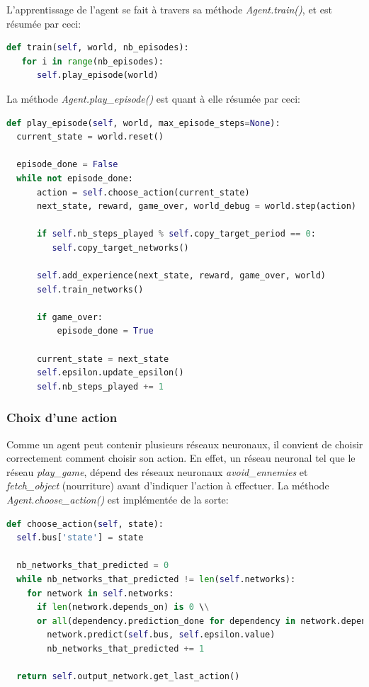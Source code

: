 \documentclass[11pt,a4paper]{report}
\begin{document}
  \par L'apprentissage de l'agent se fait à travers sa méthode \textit{Agent.train()}, et est résumée par ceci: 
  
  \begin{lstlisting}[language=python]
def train(self, world, nb_episodes):
   for i in range(nb_episodes):
      self.play_episode(world)
  \end{lstlisting} 
  
  \par La méthode \textit{Agent.play\_episode()} est quant à elle résumée par ceci: 
  
  \begin{lstlisting}[language=python]
def play_episode(self, world, max_episode_steps=None):
  current_state = world.reset()

  episode_done = False
  while not episode_done:
      action = self.choose_action(current_state)
      next_state, reward, game_over, world_debug = world.step(action)

      if self.nb_steps_played % self.copy_target_period == 0:
         self.copy_target_networks()

      self.add_experience(next_state, reward, game_over, world)
      self.train_networks()

      if game_over: 
          episode_done = True

      current_state = next_state
      self.epsilon.update_epsilon()
      self.nb_steps_played += 1

  \end{lstlisting} 
  
  \subsubsection{Choix d'une action}
  
  \par Comme un agent peut contenir plusieurs réseaux neuronaux, il convient de choisir correctement comment choisir son action. En effet, un réseau neuronal tel que le réseau \textit{play\_game}, dépend des réseaux neuronaux \textit{avoid\_ennemies} et \textit{fetch\_object} (nourriture) avant d'indiquer l'action à effectuer. La méthode \textit{Agent.choose\_action()} est implémentée de la sorte: 
  
  \begin{lstlisting}[language=python]
def choose_action(self, state):
  self.bus['state'] = state

  nb_networks_that_predicted = 0
  while nb_networks_that_predicted != len(self.networks):
    for network in self.networks:
      if len(network.depends_on) is 0 \\
      or all(dependency.prediction_done for dependency in network.depends_on):
        network.predict(self.bus, self.epsilon.value)
        nb_networks_that_predicted += 1

  return self.output_network.get_last_action()
  \end{lstlisting} 
  
\end{document}
